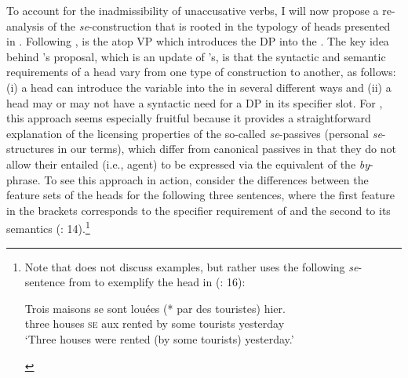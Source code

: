 \documentclass[output=paper,nonflat,newtxmath]{langsci/langscibook}
\begin{document}
To account for the inadmissibility of unaccusative verbs, I will now propose a re-analysis of the   \textit{se}-construction that is rooted in the typology of  heads presented in \citet{schaffer2017}. Following \citet{kratzer1996},  is the  atop VP which introduces the  DP into the . The key idea behind \citeauthor{schaffer2017}’s proposal, which is an update of \citeauthor{kratzer1996}’s, is that the syntactic and semantic requirements of a  head vary from one type of construction to another, as follows: (i) a  head can introduce the  variable into the  in several different ways and (ii) a  head may or may not have a syntactic need for a DP in its specifier slot.
For , this approach seems especially fruitful because it provides a straightforward explanation of the licensing properties of the so-called \textit{se}-passives (personal \textit{se}-structures in our terms), which differ from canonical passives in that they do not allow their entailed  (i.e., agent) to be expressed via the  equivalent of the \textit{by}-phrase. To see this approach in action, consider the differences between the feature sets of the  heads for the following three sentences, where the first feature in the brackets corresponds to the specifier requirement of  and the second to its semantics (\citealt{schaffer2017}: 14).\footnote{Note that \citet{schaffer2017} does not discuss  examples, but rather uses the following \textit{se}-sentence from  to exemplify  the  head in  (\citealt{schaffer2017}: 16):
\begin{exe}
\ex \gll Trois maisons se sont louées (*\hspace{-2pt} par des touristes) hier.\\
three houses \textsc{se} aux rented {} by some tourists yesterday\\
\trans `Three houses were rented (by some tourists) yesterday.'
\end{exe}}
\end{document}
